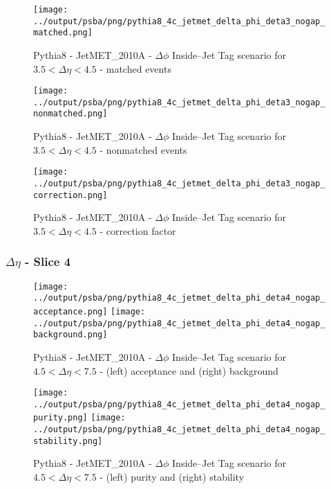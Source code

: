 \documentclass[11pt]{book}
\begin{document}
\begin{figure}[ht]
\centering
\texttt{[image: ../output/psba/png/pythia8\_4c\_jetmet\_delta\_phi\_deta3\_nogap\_matched.png]}
\caption{Pythia8 - JetMET\_2010A - $\Delta\phi$ Inside--Jet Tag scenario for $3.5 < \Delta\eta < 4.5$ - matched events}
\label{fig:p8_jetmet_delta_phi_deta3_nogap_matched}
\end{figure}

\begin{figure}[ht]
\centering
\texttt{[image: ../output/psba/png/pythia8\_4c\_jetmet\_delta\_phi\_deta3\_nogap\_nonmatched.png]}
\caption{Pythia8 - JetMET\_2010A - $\Delta\phi$ Inside--Jet Tag scenario for $3.5 < \Delta\eta < 4.5$ - nonmatched events}
\label{fig:p8_jetmet_delta_phi_deta3_nogap_nonmatched}
\end{figure}

\begin{figure}[ht]
\centering
\texttt{[image: ../output/psba/png/pythia8\_4c\_jetmet\_delta\_phi\_deta3\_nogap\_correction.png]}
\caption{Pythia8 - JetMET\_2010A - $\Delta\phi$ Inside--Jet Tag scenario for $3.5 < \Delta\eta < 4.5$ - correction factor}
\label{fig:p8_jetmet_delta_phi_deta3_nogap_correction}
\end{figure}


\clearpage
\subsubsection{$\Delta\eta$ - Slice 4}
\begin{figure}[ht]
\centering
\texttt{[image: ../output/psba/png/pythia8\_4c\_jetmet\_delta\_phi\_deta4\_nogap\_acceptance.png]}
\texttt{[image: ../output/psba/png/pythia8\_4c\_jetmet\_delta\_phi\_deta4\_nogap\_background.png]}
\caption{Pythia8 - JetMET\_2010A - $\Delta\phi$ Inside--Jet Tag scenario for $4.5 < \Delta\eta < 7.5$ - (left) acceptance and (right) background}
\label{fig:p8_jetmet_delta_phi_deta4_nogap_ab}
\end{figure}

\begin{figure}[ht]
\centering
\texttt{[image: ../output/psba/png/pythia8\_4c\_jetmet\_delta\_phi\_deta4\_nogap\_purity.png]}
\texttt{[image: ../output/psba/png/pythia8\_4c\_jetmet\_delta\_phi\_deta4\_nogap\_stability.png]}
\caption{Pythia8 - JetMET\_2010A - $\Delta\phi$ Inside--Jet Tag scenario for $4.5 < \Delta\eta < 7.5$ - (left) purity and (right) stability}
\label{fig:p8_jetmet_delta_phi_deta4_nogap_ps}
\end{figure}
\end{document}
